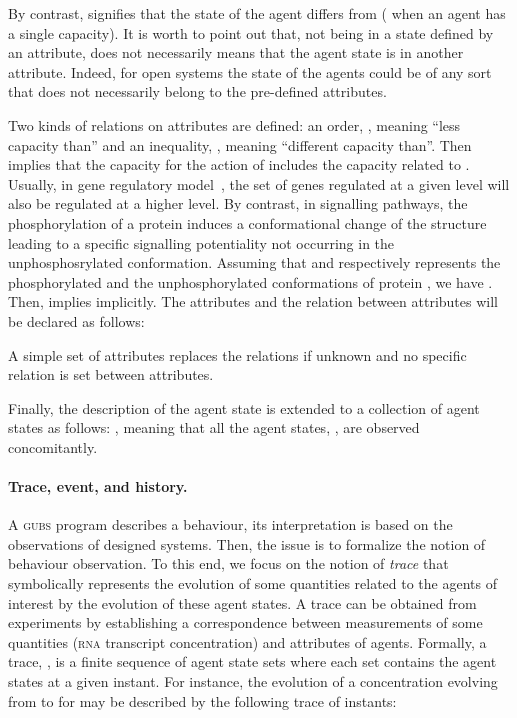 \documentclass{eptcs}
\newcommand{\eg}[0]{\abbrev{\textit{e.g.}}}
\newcounter{ti}
\begin{document}
By contrast,  signifies that the state of the agent differs from  ( when an agent has a single capacity). It is worth to point out that, not being in a state defined by an attribute, does not necessarily means that the agent state is in another attribute. Indeed, for open systems the state of the agents could be of any sort that does not necessarily belong to the pre-defined attributes. 

 Two kinds of relations on attributes are defined: an order, , meaning ``less capacity than'' and an inequality, , meaning ``different capacity than''. Then  implies that the capacity for the action of  includes the capacity related to . Usually, in gene regulatory model~\cite{Delaplace2010}, the set of genes regulated at a given level will also be regulated at a higher level. By contrast, in signalling pathways, the phosphorylation of a protein induces a conformational change of the structure leading to a specific signalling potentiality not occurring in the unphosphosrylated conformation. Assuming that  and  respectively represents the phosphorylated and the unphosphorylated conformations of protein , we have . Then,  implies  implicitly. The attributes and the relation between attributes will be declared as follows:

A simple set of attributes replaces the relations if unknown and no specific relation is set between attributes.

Finally, the description of the agent state is extended to a collection of agent states as follows: , meaning that all the agent states, , are observed concomitantly.

\paragraph{Trace, event, and history.} 
A \textsc{gubs} program describes a behaviour, its interpretation is based on the observations of designed systems. Then, the issue is to formalize the notion of behaviour observation. To this end, we focus on the notion of \emph{trace} that symbolically represents the evolution of some quantities related to the agents of interest by the evolution of these agent states. A trace can be obtained from experiments by establishing a correspondence between measurements of some quantities (\eg \textsc{rna} transcript concentration) and attributes of agents. Formally, a trace, , is a finite sequence of agent state sets where each set contains the agent states at a given instant. For instance, the evolution of a concentration evolving from  to  for  may be described by the following trace of  instants: 
\end{document}
